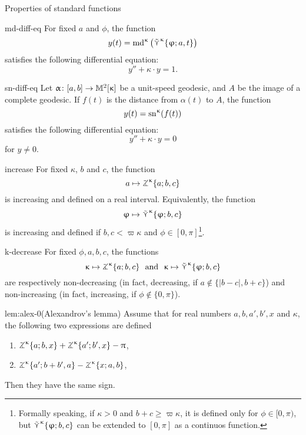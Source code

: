 \begin{thm}{Properties of standard functions}\label{md-equalities}

\begin{subthm}{md-diff-eq}
For fixed $a$ and $\phi$, the function 
\[y(t)=\mathrm{md}^{\upkappa}\left(\mathop{\tilde\curlyvee}\nolimits^{\upkappa}\{\upvarphi;a,t\}\right)\]
 satisfies the following differential equation:
\[y''+\kappa\cdot y=1.\]
\end{subthm}

\begin{subthm}{sn-diff-eq}
Let $\alpha\:[a,b]\to\Lob2\kappa$ be a unit-speed geodesic, and $A$ be the image of a complete geodesic.  If $f(t)$ is the distance from $\alpha(t)$ to $A$, the function 
\[y(t)=\mathrm{sn}^{\upkappa} (f(t))\]
 satisfies the following differential equation:
\[y''+\kappa\cdot y=0\]
for $y\ne 0$.
\end{subthm}

\begin{subthm}{increase}
For fixed $\kappa$, $b$ and $c$, the function 
\[a\mapsto\tangle\mc\kappa\{a;b,c\}\]
is increasing and defined on a real interval.
Equivalently, the function
\[\phi\mapsto\side\kappa \{\phi;b,c\}\]
is increasing and defined if $b,c<\varpi\kappa$ and $\phi\in[0,\pi]$\footnote{Formally speaking, if $\kappa>0$ and $b+c\ge \varpi\kappa$, it is defined only for $\phi\in[0,\pi)$, but $\mathop{\tilde\curlyvee}\nolimits^{\upkappa} \{\upvarphi;b,c\}$ can be extended to $[0,\pi]$ as a continuos function.}.
\end{subthm}

\begin{subthm}{k-decrease}
For fixed $\phi,a,b,c$, the functions
\[\kappa\mapsto \tangle\mc\kappa\{a;b,c\}\ \ \text{and}\ \ \kappa\mapsto \side\kappa \{\phi;b,c\}\]
are respectively non-decreasing (in fact, decreasing, if $a\notin\{|b-c|, b+c\}$) and non-increasing (in fact, increasing, if $\phi\notin\{0,\pi\}$).
\end{subthm}

\begin{subthm}{lem:alex-0}(Alexandrov's lemma)
Assume that for real numbers $a,b,a',b', x$ and $\kappa$, the following two expressions are defined
\begin{enumerate}
\item $\tangle\mc\kappa\{a;b,x\}+\tangle\mc\kappa\{a';b',x\}-\pi$,
\item $\tangle\mc\kappa\{a';b+b',a\}-\tangle\mc\kappa\{x;a,b\}$,
\end{enumerate}
Then they have the same sign.
\end{subthm}
\end{thm}


